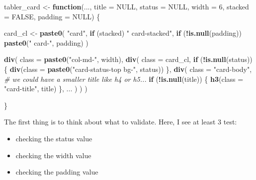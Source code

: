 \documentclass[]{book}
\newenvironment{Shaded}{\begin{snugshade}}{\end{snugshade}}
\newcommand{\CommentTok}[1]{\textcolor[rgb]{0.56,0.35,0.01}{\textit{#1}}}
\newcommand{\ControlFlowTok}[1]{\textcolor[rgb]{0.13,0.29,0.53}{\textbf{#1}}}
\newcommand{\DataTypeTok}[1]{\textcolor[rgb]{0.13,0.29,0.53}{#1}}
\newcommand{\DecValTok}[1]{\textcolor[rgb]{0.00,0.00,0.81}{#1}}
\newcommand{\KeywordTok}[1]{\textcolor[rgb]{0.13,0.29,0.53}{\textbf{#1}}}
\newcommand{\NormalTok}[1]{#1}
\newcommand{\OperatorTok}[1]{\textcolor[rgb]{0.81,0.36,0.00}{\textbf{#1}}}
\newcommand{\OtherTok}[1]{\textcolor[rgb]{0.56,0.35,0.01}{#1}}
\newcommand{\StringTok}[1]{\textcolor[rgb]{0.31,0.60,0.02}{#1}}
\providecommand{\tightlist}{%
  \setlength{\itemsep}{0pt}\setlength{\parskip}{0pt}}
\begin{document}
\begin{Shaded}
\begin{Highlighting}[]
\NormalTok{tabler_card <-}\StringTok{ }\ControlFlowTok{function}\NormalTok{(..., }\DataTypeTok{title =} \OtherTok{NULL}\NormalTok{, }\DataTypeTok{status =} \OtherTok{NULL}\NormalTok{, }\DataTypeTok{width =} \DecValTok{6}\NormalTok{, }\DataTypeTok{stacked =} \OtherTok{FALSE}\NormalTok{, }\DataTypeTok{padding =} \OtherTok{NULL}\NormalTok{) \{}
  
\NormalTok{  card_cl <-}\StringTok{ }\KeywordTok{paste0}\NormalTok{(}
    \StringTok{"card"}\NormalTok{, }
    \ControlFlowTok{if}\NormalTok{ (stacked) }\StringTok{" card-stacked"}\NormalTok{,}
    \ControlFlowTok{if}\NormalTok{ (}\OperatorTok{!}\KeywordTok{is.null}\NormalTok{(padding)) }\KeywordTok{paste0}\NormalTok{(}\StringTok{" card-"}\NormalTok{, padding)}
\NormalTok{  )}
  
  \KeywordTok{div}\NormalTok{(}
    \DataTypeTok{class =} \KeywordTok{paste0}\NormalTok{(}\StringTok{"col-md-"}\NormalTok{, width),}
    \KeywordTok{div}\NormalTok{(}
      \DataTypeTok{class =}\NormalTok{ card_cl,}
      \ControlFlowTok{if}\NormalTok{ (}\OperatorTok{!}\KeywordTok{is.null}\NormalTok{(status)) \{}
        \KeywordTok{div}\NormalTok{(}\DataTypeTok{class =} \KeywordTok{paste0}\NormalTok{(}\StringTok{"card-status-top bg-"}\NormalTok{, status))}
\NormalTok{      \},}
      \KeywordTok{div}\NormalTok{(}
        \DataTypeTok{class =} \StringTok{"card-body"}\NormalTok{,}
        \CommentTok{# we could have a smaller title like h4 or h5...}
        \ControlFlowTok{if}\NormalTok{ (}\OperatorTok{!}\KeywordTok{is.null}\NormalTok{(title)) \{}
          \KeywordTok{h3}\NormalTok{(}\DataTypeTok{class =} \StringTok{"card-title"}\NormalTok{, title)}
\NormalTok{        \},}
\NormalTok{        ...}
\NormalTok{      )}
\NormalTok{    )}
\NormalTok{  )}
  
\NormalTok{\}}
\end{Highlighting}
\end{Shaded}

The first thing is to think about what to validate. Here, I see at least 3 test:

\begin{itemize}
\tightlist
\item
  checking the status value
\item
  checking the width value
\item
  checking the padding value
\end{itemize}
\end{document}
